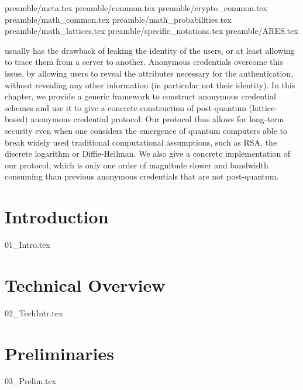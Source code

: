 {

{preamble/meta.tex}
{preamble/common.tex}
{preamble/crypto_common.tex}
{preamble/math_common.tex}
{preamble/math_probabilities.tex}
{preamble/math_lattices.tex}
{preamble/specific_notations.tex}
{preamble/ARES.tex}


 \label{cha:groupsig}


 usually has the drawback of 
leaking the identity of the users, or at least allowing to trace them from a 
server to another. Anonymous credentials overcome this issue, by allowing 
users to reveal the attributes necessary for the authentication, without 
revealing any other information (in particular not their identity). In this 
chapter, we provide a generic framework to construct anonymous credential 
schemes and use it to give a concrete construction of post-quantum 
(lattice-based) anonymous credential protocol. Our protocol thus allows for 
long-term security even when one considers the emergence of quantum computers 
able to break widely used traditional computational assumptions, such as RSA, 
the discrete logarithm or Diffie-Hellman. We also give a concrete 
implementation of our protocol, which is only one order of magnitude slower 
and bandwidth consuming than previous anonymous credentials that are not 
post-quantum.

\section{Introduction}\label{sec:introduction}
{01_Intro.tex}

\section{Technical Overview}\label{sec:technical_details}
{02_TechIntr.tex}

\section{Preliminaries}\label{sec:preliminaries}
{03_Prelim.tex}

}
